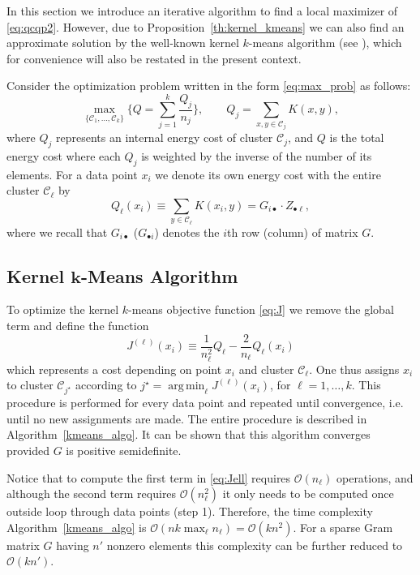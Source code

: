 \documentclass[aps,preprint,nofootinbib,floatfix]{revtex4-1}
\DeclareMathOperator*{\argmin}{arg\,min}
\newcommand\kk{K}
\newcommand\C{{\mathcal{C}}}
\newcommand\OO{{\mathcal{O}}}
\begin{document}
In this section we introduce an iterative algorithm to find a local
maximizer of \eqref{eq:qcqp2}. However, due to 
Proposition~\ref{th:kernel_kmeans} we can also find an approximate
solution by the well-known kernel $k$-means algorithm 
(see \cite{Dhillon2,Dhillon}), which 
for convenience will also be restated in the present context.

Consider the optimization problem 
written in the form \eqref{eq:max_prob} as follows:
\begin{equation}
\label{eq:maxQ}
\max_{\{ \C_1,\dotsc,\C_k \}} 
\bigg\{ Q = \sum_{j=1}^k \dfrac{Q_j}{n_j}  \bigg\},
\qquad Q_j = \sum_{x,y\in\C_j} \kk(x,y),
\end{equation}
where $Q_j$ represents an internal energy cost of cluster $\C_j$, and
$Q$ is the total energy cost where each $Q_j$ 
is weighted by the inverse
of the number of its elements. For a data point $x_i$ we denote
its own energy cost
with the entire cluster $\C_\ell$ by
\begin{equation}
\label{eq:costxij}
Q_\ell(x_i) \equiv \sum_{y\in\C_\ell} \kk(x_i, y) = 
G_{i \bullet} \cdot Z_{\bullet \ell},
\end{equation}
where we recall that $G_{i\bullet}$ ($G_{\bullet i}$) denotes
the $i$th row (column) of matrix $G$.

\subsection*{Kernel $\bm{k}$-Means Algorithm}

To optimize the kernel $k$-means objective function
\eqref{eq:J} we remove the global term and define the function
\begin{equation}
\label{eq:Jell}
J^{(\ell)}(x_i) \equiv 
\dfrac{1}{n_\ell^2} Q_\ell
-\dfrac{2}{n_\ell} Q_\ell(x_i) 
\end{equation}
which represents a cost depending on point $x_i$ and cluster $\C_\ell$. One
thus assigns  $x_i$ to cluster $\C_{j^\star}$ according
to $j^\star = \argmin_\ell J^{(\ell)}(x_i)$, for $\ell = 1,\dotsc,k$.
This procedure is performed for every data point and repeated until
convergence, i.e. until no new assignments are made.
The entire procedure is described in Algorithm~\ref{kmeans_algo}.
It can be shown that this algorithm converges provided $G$ is positive
semidefinite.

Notice that to compute the first term in \eqref{eq:Jell} requires
$\OO(n_\ell)$ operations, and although the second term requires
$\OO(n_\ell^2)$ it only needs to be computed once outside loop through
data points (step 1).
Therefore, the time complexity Algorithm~\ref{kmeans_algo} is
$\OO(n k \max_\ell n_\ell) = \OO(k n^2)$. For a sparse
Gram matrix $G$ having
$n'$ nonzero elements this complexity can be further reduced
to $\OO(k n')$. 
\end{document}
